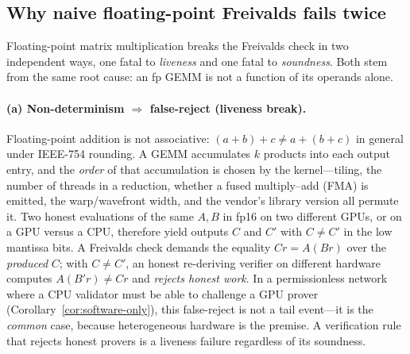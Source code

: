 \subsection{Why naive floating-point Freivalds fails twice}
\label{sec:fp-fails}

Floating-point matrix multiplication breaks the Freivalds check in two independent
ways, one fatal to \emph{liveness} and one fatal to \emph{soundness}. Both stem from
the same root cause: an fp GEMM is not a function of its operands alone.

\paragraph{(a) Non-determinism $\Rightarrow$ false-reject (liveness break).}
Floating-point addition is not associative: $(a+b)+c \ne a+(b+c)$ in general under
IEEE-754 rounding. A GEMM accumulates $k$ products into each output entry, and the
\emph{order} of that accumulation is chosen by the kernel---tiling, the number of
threads in a reduction, whether a fused multiply--add (FMA) is emitted, the
warp/wavefront width, and the vendor's library version all permute it. Two honest
evaluations of the same $A,B$ in fp16 on two different GPUs, or on a GPU versus a CPU,
therefore yield outputs $C$ and $C'$ with $C \ne C'$ in the low mantissa bits. A
Freivalds check demands the equality $C r = A(Br)$ over the \emph{produced} $C$; with
$C \ne C'$, an honest re-deriving verifier on different hardware computes $A(B'r) \ne
C r$ and \emph{rejects honest work}. In a permissionless network where a CPU validator
must be able to challenge a GPU prover (Corollary~\ref{cor:software-only}), this
false-reject is not a tail event---it is the \emph{common} case, because heterogeneous
hardware is the premise. A verification rule that rejects honest provers is a liveness
failure regardless of its soundness.

